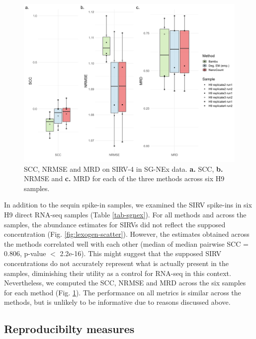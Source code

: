 \begin{figure}[H]
    \centering
    \includegraphics[width=\textwidth]{figures/lexogen.png}
    \caption[SCC, NRMSE and MRD on SIRVs in SG-NEx data]{SCC, NRMSE and MRD on SIRV-4 in SG-NEx data. \textbf{a.} SCC, \textbf{b.} NRMSE and \textbf{c.} MRD for each of the three methods across six H9 samples.}
    \label{fig:lexogen-metrics}
\end{figure}

In addition to the sequin spike-in samples, we examined the SIRV spike-ins in six H9 direct RNA-seq samples (Table \ref{tab-sgnex}). For all methods and across the samples, the abundance estimates for SIRVs did not reflect the supposed concentration (Fig. \ref{fig:lexogen-scatter}). However, the estimates obtained across the methods correlated well with each other (median of median pairwise SCC = 0.806, p-value $<$ 2.2e-16). This might suggest that the supposed SIRV concentrations do not accurately represent what is actually present in the samples, diminishing their utility as a control for RNA-seq in this context. Nevertheless, we computed the SCC, NRMSE and MRD across the six samples for each method (Fig. \ref{fig:lexogen-metrics}). The performance on all metrics is similar across the methods, but is unlikely to be informative due to reasons discussed above.   

\subsection{Reproducibilty measures}

